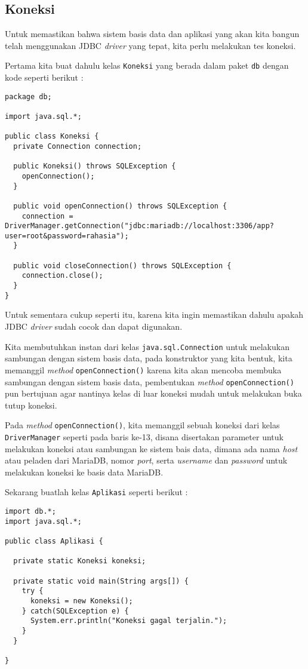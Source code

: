 \subsection{Koneksi}

Untuk memastikan bahwa sistem basis data dan aplikasi yang akan kita bangun telah menggunakan JDBC \textit{driver} yang tepat, kita perlu melakukan tes koneksi. 

Pertama kita buat dahulu kelas \texttt{Koneksi} yang berada dalam paket \texttt{db} dengan kode seperti berikut :

\begin{lstlisting}
package db;

import java.sql.*;

public class Koneksi {
  private Connection connection;
  
  public Koneksi() throws SQLException {
    openConnection();
  }
  
  public void openConnection() throws SQLException {
    connection = DriverManager.getConnection("jdbc:mariadb://localhost:3306/app?user=root&password=rahasia");
  }
  
  public void closeConnection() throws SQLException {
    connection.close();
  }
}
\end{lstlisting}



Untuk sementara cukup seperti itu, karena kita ingin memastikan dahulu apakah JDBC \textit{driver} sudah cocok dan dapat digunakan. 

Kita membutuhkan instan dari kelas \texttt{java.sql.Connection} untuk melakukan sambungan dengan sistem basis data, pada konstruktor yang kita bentuk, kita memanggil \textit{method} \texttt{openConnection()} karena kita akan mencoba membuka sambungan dengan sistem basis data, pembentukan \textit{method} \texttt{openConnection()} pun bertujuan agar nantinya kelas di luar koneksi mudah untuk melakukan buka tutup koneksi.

Pada \textit{method} \texttt{openConnection()}, kita memanggil sebuah koneksi dari kelas \texttt{DriverManager} seperti pada baris ke-13, disana disertakan parameter untuk melakukan koneksi atau sambungan ke sistem bais data, dimana ada nama \textit{host} atau peladen dari MariaDB, nomor \textit{port}, serta \textit{username} dan \textit{password} untuk melakukan koneksi ke basis data MariaDB.

Sekarang buatlah kelas \texttt{Aplikasi} seperti berikut :

\begin{lstlisting}
import db.*;
import java.sql.*;

public class Aplikasi {

  private static Koneksi koneksi;

  private static void main(String args[]) {
    try {
      koneksi = new Koneksi();
    } catch(SQLException e) {
      System.err.println("Koneksi gagal terjalin.");
    }
  }
  
}
\end{lstlisting}

